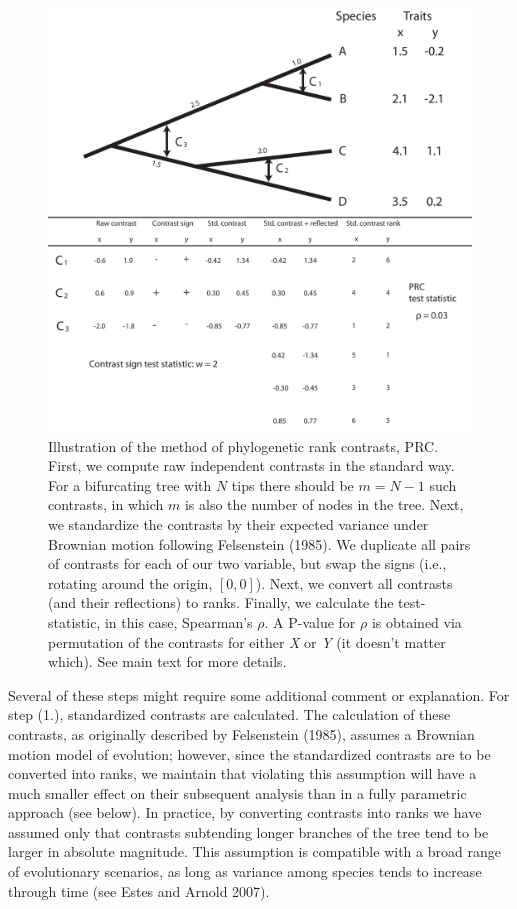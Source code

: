 \documentclass[fleqn,10pt,lineno]{wlpeerj} %
\begin{document}
\begin{figure}
\includegraphics[width=1\linewidth]{Harmon-fig1} \caption{Illustration of the method of phylogenetic rank contrasts, PRC. First, we compute raw independent contrasts in the standard way. For a bifurcating tree with $N$ tips there should be $m=N-1$ such contrasts, in which $m$ is also the number of nodes in the tree. Next, we standardize the contrasts by their expected variance under Brownian motion following Felsenstein (1985). We duplicate all pairs of contrasts for each of our two variable, but swap the signs (i.e., rotating around the origin, $[0,0]$). Next, we convert all contrasts (and their reflections) to ranks. Finally, we calculate the test-statistic, in this case, Spearman's $\rho$. A P-value for $\rho$ is obtained via permutation of the contrasts for either \emph{X} or \emph{Y} (it doesn't matter which). See main text for more details.}\label{fig:Harmon-fig1}
\end{figure}

Several of these steps might require some additional comment or explanation.
For step (1.), standardized contrasts are calculated. The calculation of these contrasts, as originally described by Felsenstein (1985), assumes a Brownian motion model of evolution; however, since the standardized contrasts are to be converted into ranks, we maintain that violating this assumption will have a much smaller effect on their subsequent analysis than in a fully parametric approach (see below). In practice, by converting contrasts into ranks we have assumed only that contrasts subtending longer branches of the tree tend to be larger in absolute magnitude. This assumption is compatible with a broad range of evolutionary scenarios, as long as variance among species tends to increase through time (see Estes and Arnold 2007).
\end{document}
